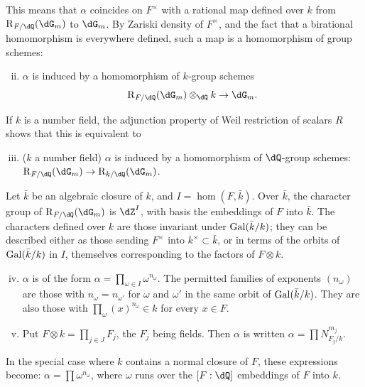 This means that $\alpha$ coincides on $F^\times$ with a rational
map defined over $k$ from $\res_{F/\dQ}(\dG_m)$ to $\dG_m$. By
Zariski density of $F^\times$, and the fact that a birational homomorphism
is everywhere defined, such a map is a homomorphism of group
schemes: 
\begin{enumerate}[(i)]
\setcounter{enumi}{1}
  \item $\alpha$ is induced by a homomorphism of $k$-group schemes
    \[
      \res_{F/\dQ}(\dG_m)\otimes_\dQ k \to \dG_m \text{.}
    \]
\end{enumerate}

If $k$ is a number field, the adjunction property of Weil restriction
of scalars $R$ shows that this is equivalent to 
\begin{enumerate}[(i)]
\setcounter{enumi}{2}
  \item ($k$ a number field) $\alpha$ is induced by a homomorphism of
    $\dQ$-group schemes: $\res_{F/\dQ}(\dG_m) \to \res_{k/\dQ}(\dG_m)$.
\end{enumerate}

Let $\bar k$ be an algebraic closure of $k$, and $I=\hom(F,\bar k)$. Over
$\bar k$, the character group of $\res_{F/\dQ}(\dG_m)$ is $\dZ^I$, with
basis the embeddings of $F$ into $\bar k$. The characters defined over $k$
are those invariant under $\operatorname{Gal}(\bar k/k)$; they can be described either as
those sending $F^\times$ into $k^\times\subset \bar k$, or in terms of the
orbits of $\operatorname{Gal}(\bar k/k)$ in $I$, themselves corresponding to the factors of
$F\otimes k$. 
\begin{enumerate}[(i)]
\setcounter{enumi}{3}
  \item $\alpha$ is of the form
    $\alpha=\prod_{\omega\in I} \omega^{n_\omega}$. The permitted families of exponents
    $(n_\omega)$ are those with $n_\omega=n_{\omega'}$ for
    $\omega$ and $\omega'$ in the same orbit of $\operatorname{Gal}(\bar k/k)$. They are
    also those with $\prod_\omega (x)^{n_\omega}\in k$ for every
    $x\in F$.
  \item Put $F\otimes k=\prod_{j\in J} F_j$, the $F_j$ being fields.
    Then $\alpha$ is written $\alpha=\prod N_{F_j/k}^{m_j}$.
\end{enumerate}

In the special case where $k$ contains a normal closure of $F$, these
expressions become: $\alpha=\prod \omega^{n_\omega}$, where $\omega$
runs over the $[F:\dQ]$ embeddings of $F$ into $k$. 






